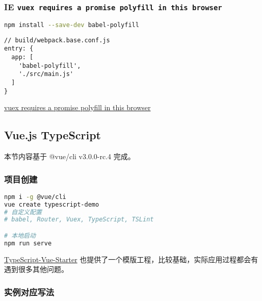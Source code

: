 \subsubsection{\texorpdfstring{IE
\texttt{vuex\ requires\ a\ promise\ polyfill\ in\ this\ browser}}{IE vuex requires a promise polyfill in this browser}}\label{ie-vuex-requires-a-promise-polyfill-in-this-browser}

\begin{lstlisting}[language=bash]
npm install --save-dev babel-polyfill
\end{lstlisting}

\begin{lstlisting}
// build/webpack.base.conf.js
entry: {
  app: [
    'babel-polyfill',
    './src/main.js'
  ]
}
\end{lstlisting}

\href{https://github.com/vuejs-templates/webpack/issues/474}{vuex
requires a promise polyfill in this browser}

\subsection{Vue.js TypeScript}\label{vue.js-typescript}

本节内容基于 @vue/cli v3.0.0-rc.4 完成。

\subsubsection{项目创建}\label{ux9879ux76eeux521bux5efa}

\begin{lstlisting}[language=bash]
npm i -g @vue/cli
vue create typescript-demo
# 自定义配置
# babel, Router, Vuex, TypeScript, TSLint

# 本地启动
npm run serve
\end{lstlisting}

\href{https://github.com/Microsoft/TypeScript-Vue-Starter}{TypeScript-Vue-Starter}
也提供了一个模版工程，比较基础，实际应用过程都会有遇到很多其他问题。

\subsubsection{实例对应写法}\label{ux5b9eux4f8bux5bf9ux5e94ux5199ux6cd5}

